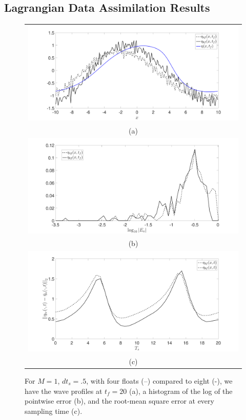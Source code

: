 

\subsection*{Lagrangian Data Assimilation Results}

\begin{figure}
	\centering
	\begin{tabular}{c}
		\includegraphics[width=.95\textwidth]{Images/wave_tf_20_sig_pt1_4_vs8floats_Mval_1} \\
		(a)\\
		\includegraphics[width=.95\textwidth]{Images/histogram_tf_20_sig_pt1_4_vs_8floats_Mval_1}\\
		(b)\\
		\includegraphics[width=.95\textwidth]{Images/rmserr_tf_20_sig_pt1_4_vs8floats_Mval_1}\\
		(c)
	\end{tabular}
	\caption{For $M=1$, $dt_{s}=.5$, with four floats (--) compared to eight (-), we have the wave profiles at $t_{f}=20$ (a), a histogram of the log of the pointwise error (b), and the root-mean square error at every sampling time (c).} 
	\label{fig:Mval_1}
\end{figure}


